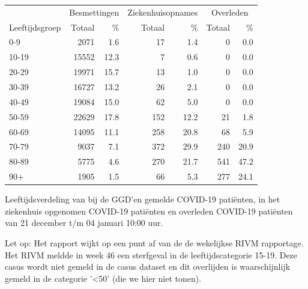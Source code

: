 \documentclass[
  english,
  man,floatsintext]{apa6}
\begin{document}
\begin{table}[H]
\centering\begingroup\fontsize{11}{13}\selectfont

\begin{threeparttable}
\begin{tabular}{lrrrrrr}
\toprule
\multicolumn{1}{c}{ } & \multicolumn{2}{c}{Besmettingen} & \multicolumn{2}{c}{Ziekenhuisopnames} & \multicolumn{2}{c}{Overleden} \\
\cmidrule(l{3pt}r{3pt}){2-3} \cmidrule(l{3pt}r{3pt}){4-5} \cmidrule(l{3pt}r{3pt}){6-7}
Leeftijdsgroep & Totaal & \% & Totaal & \% & Totaal & \%\\
\midrule
0-9 & 2071 & 1.6 & 17 & 1.4 & 0 & 0.0\\
10-19 & 15552 & 12.3 & 7 & 0.6 & 0 & 0.0\\
20-29 & 19971 & 15.7 & 13 & 1.0 & 0 & 0.0\\
30-39 & 16727 & 13.2 & 26 & 2.1 & 0 & 0.0\\
40-49 & 19084 & 15.0 & 62 & 5.0 & 0 & 0.0\\
50-59 & 22629 & 17.8 & 152 & 12.2 & 21 & 1.8\\
60-69 & 14095 & 11.1 & 258 & 20.8 & 68 & 5.9\\
70-79 & 9037 & 7.1 & 372 & 29.9 & 240 & 20.9\\
80-89 & 5775 & 4.6 & 270 & 21.7 & 541 & 47.2\\
90+ & 1905 & 1.5 & 66 & 5.3 & 277 & 24.1\\
\bottomrule
\end{tabular}
\begin{tablenotes}
\item[1] Leeftijdsverdeling van bij de GGD’en gemelde COVID-19 patiënten, in het ziekenhuis opgenomen COVID-19 patiënten en overleden COVID-19 patiënten van 21 december t/m 04 januari 10:00 uur.
\item[2] Let op: Het rapport wijkt op een punt af van de de wekelijkse RIVM rapportage. Het RIVM meldde in week 46 een sterfgeval in de leeftijdscategorie 15-19. Deze casus wordt niet gemeld in de casus dataset en dit overlijden is waarschijnlijk gemeld in de categorie '<50' (die we hier niet tonen).
\end{tablenotes}
\end{threeparttable}
\endgroup{}
\end{table}

\newpage
\end{document}
